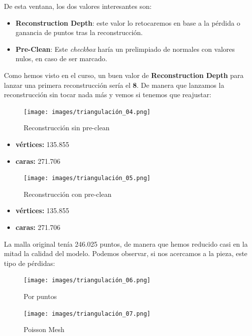 \documentclass[options]{article}
\begin{document}
De esta ventana, los dos valores interesantes son:
\begin{itemize}
    \item \textbf{Reconstruction Depth}: este valor lo retocaremos en base a la pérdida o ganancia de puntos tras la reconstrucción.
    \item \textbf{Pre-Clean}: Este \textit{checkbox} haría un prelimpiado de normales con valores nulos, en caso de ser marcado.
\end{itemize}

\pagebreak

Como hemos visto en el curso, un buen valor de \textbf{Reconstruction Depth} para lanzar una primera reconstrucción sería el \textbf{8}. De manera que lanzamos la reconstrucción sin tocar nada más y vemos si tenemos que reajustar:

\begin{figure}[H]
    \centering
    \texttt{[image: images/triangulación\_04.png]}
    \caption{Reconstrucción sin pre-clean}
\end{figure}

\begin{itemize}
    \item \textbf{vértices:} 135.855
    \item \textbf{caras:} 271.706
\end{itemize}


\begin{figure}[H]
    \centering       
    \texttt{[image: images/triangulación\_05.png]}
    \caption{Reconstrucción con pre-clean}
\end{figure}

\begin{itemize}
    \item \textbf{vértices:} 135.855
    \item \textbf{caras:} 271.706
\end{itemize}

La malla original tenía 246.025 puntos, de manera que hemos reducido casi en la mitad la calidad del modelo. Podemos observar, si nos acercamos a la pieza, este tipo de pérdidas:
\begin{figure}[H]
    \centering 
    \texttt{[image: images/triangulación\_06.png]} \\
    \caption{Por puntos}
\end{figure}
\begin{figure}[H]
    \centering 
    \texttt{[image: images/triangulación\_07.png]} \\
    \caption{Poisson Mesh}
\end{figure}
\end{document}
